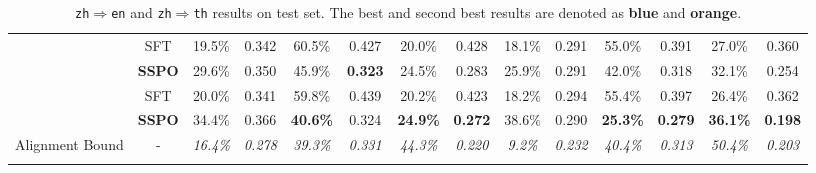 \begin{table}[!h]
{\begin{tabular}{cccccccc|cccccc}
 \hdashline
 \multirow{2}{*}{GLM-4-9B-Chat} & SFT & 19.5\% & 0.342 & 60.5\% & 0.427 & 20.0\% & 0.428 & 18.1\% & 0.291 & 55.0\% & 0.391 & 27.0\% & 0.360 \\
 ~ & \textbf{SSPO} & 29.6\% & 0.350 & 45.9\% & \colorbox{mlo}{\textbf{0.323}} & 24.5\% & 0.283 & 25.9\% & 0.291 & 42.0\% & 0.318 & 32.1\% & 0.254 \\
 \hdashline
 \multirow{2}{*}{Qwen2.5-14B-Instruct} & SFT & 20.0\% & 0.341 & 59.8\% & 0.439 & 20.2\% & 0.423 & 18.2\% & 0.294 & 55.4\% & 0.397 & 26.4\% & 0.362 \\
 ~ & \textbf{SSPO} & 34.4\% & 0.366 & \colorbox{mlb}{\textbf{40.6\%}} & 0.324 & \colorbox{mlo}{\textbf{24.9\%}} & \colorbox{mlo}{\textbf{0.272}} & 38.6\% & 0.290 & \colorbox{mlb}{\textbf{25.3\%}} & \colorbox{mlb}{\textbf{0.279}} & \colorbox{mlo}{\textbf{36.1\%}} & \colorbox{mlb}{\textbf{0.198}} \\
 \hdashline
 Alignment Bound & - & \textit{16.4\%} & \textit{0.278} & \textit{39.3\%} & \textit{0.331} & \textit{44.3\%} & \textit{0.220} & \textit{9.2\%} & \textit{0.232} & \textit{40.4\%} & \textit{0.313} & \textit{50.4\%} & \textit{0.203} \\
 \Xhline{1.0pt}
\end{tabular}}
\caption{\texttt{zh}$\Rightarrow$\texttt{en} and \texttt{zh}$\Rightarrow$\texttt{th} results on test set. The best and second best results are denoted as \colorbox{mlb}{\textbf{blue}} and \colorbox{mlo}{\textbf{orange}}.}
\label{tab:exp-main}
\end{table}
